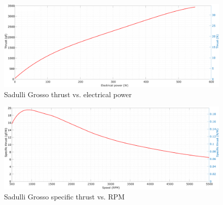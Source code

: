 \begin{figure}[!hbt]
    \centerline{\includegraphics[width=1\textwidth]{figures/thrust_graphs/grosso_thrust-power.pdf}}
    \caption{Sadulli Grosso thrust  vs. electrical power}
\end{figure}

\begin{figure}[!hbt]
    \centerline{\includegraphics[width=1\textwidth]{figures/thrust_graphs/grosso_specific_thrust-rpm.pdf}}
    \caption{Sadulli Grosso specific thrust vs. RPM}
\end{figure}